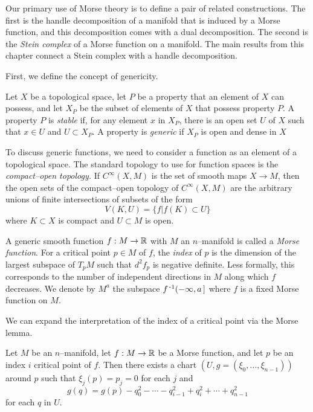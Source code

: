 \label{sec:morsetheory}

Our primary use of Morse theory is to define a pair of related constructions.
The first is the handle decomposition of a manifold that is induced by a Morse function, and this decomposition comes with a dual decomposition.
The second is the \emph{Stein complex} of a Morse function on a manifold.
The main results from this chapter connect a Stein complex with a handle decomposition.

First, we define the concept of genericity.

\begin{defn}
	Let $X$ be a topological space, let $P$ be a property that an element of $X$ can possess, and let $X_P$ be the subset of elements of $X$ that possess property $P$.
	A property $P$ is \emph{stable} if, for any element $x$ in $X_P$, there is an open set $U$ of $X$ such that $x\in U$ and $U\subset X_P$.
	A property is \emph{generic} if $X_P$ is open and dense in $X$
\end{defn}

To discuss generic functions, we need to consider a function as an element of a topological space.
The standard topology to use for function spaces is the \emph{compact--open topology.}
If $C^\infty(X,M)$ is the set of smooth maps $X\to M$, then the open sets of the compact--open topology of $C^\infty(X,M)$ are the arbitrary unions of finite intersections of subsets of the form
\[
	V(K,U) = \{f|f(K)\subset U\}
\] 
where $K\subset X$ is compact and $U\subset M$ is open.

\begin{defn}
	A generic smooth function $f:M\to\mathbb{R}$ with $M$ an $n$--manifold is called a \emph{Morse function}.
	For a critical point $p\in M$ of $f$, the \emph{index} of $p$ is the dimension of the largest subspace of $T_p M$ such that $d^2f_p$ is negative definite.
	Less formally, this corresponds to the number of independent directions in $M$ along which $f$ decreases.
	We denote by $M^a$ the subspace $f^{\,\text{-}1}(-\infty,a\,]$ where $f$ is a fixed Morse function on $M$.
\end{defn}

We can expand the interpretation of the index of a critical point via the Morse lemma.

\begin{lem}
  \label{lem:morselemma}
  Let $M$ be an $n$--manifold, let $f:M\to\mathbb{R}$ be a Morse function, and let $p$ be an index $i$ critical point of $f$.
  Then there exists a chart $(U,g=(\xi_0,\dots,\xi_{n-1}))$ around $p$ such that $\xi_j(p)=p_j=0$ for each $j$ and
  \[
    g(q) = g(p) - q_0^2 - \cdots - q_{i-1}^2 + q_i^2 + \cdots + q_{n-1}^2
  \]
  for each $q$ in $U$.
\end{lem}

